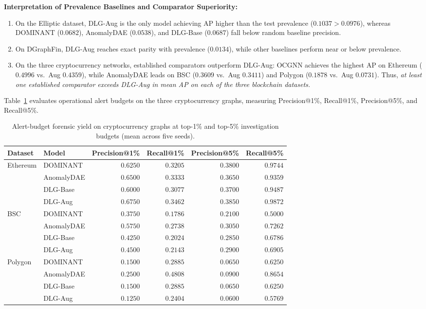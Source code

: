 \documentclass[applsci,article,submit,moreauthors,pdftex]{Definitions/mdpi}
\begin{document}
\textbf{Interpretation of Prevalence Baselines and Comparator Superiority:}
\begin{enumerate}
    \item On the Elliptic dataset, DLG-Aug is the only model achieving AP higher than the test prevalence ($0.1037 > 0.0976$), whereas DOMINANT ($0.0682$), AnomalyDAE ($0.0538$), and DLG-Base ($0.0687$) fall below random baseline precision.
    \item On DGraphFin, DLG-Aug reaches exact parity with prevalence ($0.0134$), while other baselines perform near or below prevalence.
    \item On the three cryptocurrency networks, established comparators outperform DLG-Aug: OCGNN achieves the highest AP on Ethereum ($0.4996$ vs.\ Aug $0.4359$), while AnomalyDAE leads on BSC ($0.3609$ vs.\ Aug $0.3411$) and Polygon ($0.1878$ vs.\ Aug $0.0731$). Thus, \textit{at least one established comparator exceeds DLG-Aug in mean AP on each of the three blockchain datasets.}
\end{enumerate}

Table~\ref{tab:alert_budget} evaluates operational alert budgets on the three cryptocurrency graphs, measuring Precision@1\%, Recall@1\%, Precision@5\%, and Recall@5\%.

\begin{table}[htbp]
\centering\small
\caption{Alert-budget forensic yield on cryptocurrency graphs at top-1\% and top-5\% investigation budgets (mean across five seeds).}
\label{tab:alert_budget}
\begin{tabularx}{\textwidth}{llrrrr}\toprule
\textbf{Dataset} & \textbf{Model} & \textbf{Precision@1\%} & \textbf{Recall@1\%} & \textbf{Precision@5\%} & \textbf{Recall@5\%} \\\midrule
Ethereum & DOMINANT & $0.6250$ & $0.3205$ & $0.3800$ & $0.9744$ \\
 & AnomalyDAE & $0.6500$ & $0.3333$ & $0.3650$ & $0.9359$ \\
 & DLG-Base & $0.6000$ & $0.3077$ & $0.3700$ & $0.9487$ \\
 & DLG-Aug & $\mathbf{0.6750}$ & $\mathbf{0.3462}$ & $\mathbf{0.3850}$ & $\mathbf{0.9872}$ \\\midrule
BSC & DOMINANT & $0.3750$ & $0.1786$ & $0.2100$ & $0.5000$ \\
 & AnomalyDAE & $\mathbf{0.5750}$ & $\mathbf{0.2738}$ & $\mathbf{0.3050}$ & $\mathbf{0.7262}$ \\
 & DLG-Base & $0.4250$ & $0.2024$ & $0.2850$ & $0.6786$ \\
 & DLG-Aug & $0.4500$ & $0.2143$ & $0.2900$ & $0.6905$ \\\midrule
Polygon & DOMINANT & $0.1500$ & $0.2885$ & $0.0650$ & $0.6250$ \\
 & AnomalyDAE & $\mathbf{0.2500}$ & $\mathbf{0.4808}$ & $\mathbf{0.0900}$ & $\mathbf{0.8654}$ \\
 & DLG-Base & $0.1500$ & $0.2885$ & $0.0650$ & $0.6250$ \\
 & DLG-Aug & $0.1250$ & $0.2404$ & $0.0600$ & $0.5769$ \\\bottomrule
\end{tabularx}
\end{table}
\end{document}
